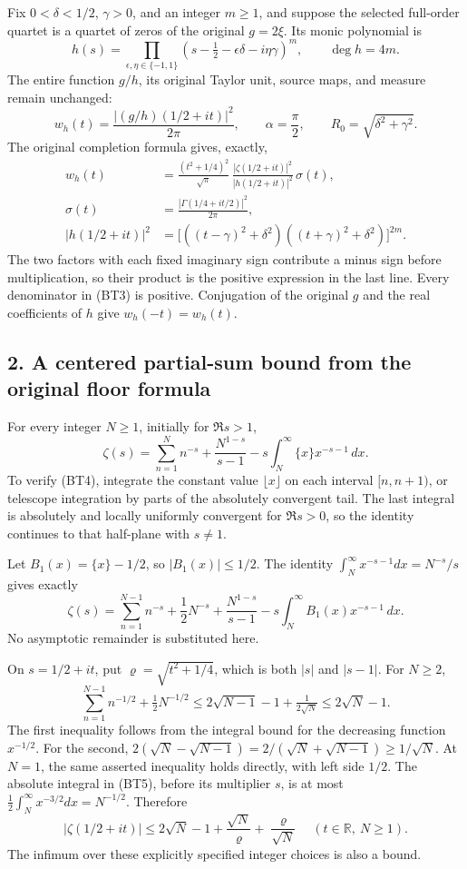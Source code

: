 Fix \(0<\delta<1/2\), \(\gamma>0\), and an integer \(m\ge1\), and suppose the selected full-order quartet is a quartet of zeros of the original \(g=2\xi\). Its monic polynomial is \[
h(s)=\prod_{\epsilon,\eta\in\{-1,1\}}
 (s-\tfrac12-\epsilon\delta-i\eta\gamma)^m,
\qquad \deg h=4m.
\tag{BT1}
\] The entire function \(g/h\), its original Taylor unit, source maps, and measure remain unchanged: \[
w_h(t)=\frac{|(g/h)(1/2+it)|^2}{2\pi},\qquad
\alpha=\frac\pi2,\qquad R_0=\sqrt{\delta^2+\gamma^2}.
\tag{BT2}
\] The original completion formula gives, exactly, \[
\begin{split}
w_h(t)
&=\frac{(t^2+1/4)^2}{\sqrt\pi}\,
 \frac{|\zeta(1/2+it)|^2}{|h(1/2+it)|^2}\,\sigma(t),\\
\sigma(t)
&=\frac{|\Gamma(1/4+it/2)|^2}{2\pi},\\
|h(1/2+it)|^2
&=\bigl[((t-\gamma)^2+\delta^2)
              ((t+\gamma)^2+\delta^2)\bigr]^{2m}.
\end{split}
\tag{BT3}
\] The two factors with each fixed imaginary sign contribute a minus sign before multiplication, so their product is the positive expression in the last line. Every denominator in (BT3) is positive. Conjugation of the original \(g\) and the real coefficients of \(h\) give \(w_h(-t)=w_h(t)\).

\subsection{2. A centered partial-sum bound from the original floor formula}\label{bt:a-centered-partial-sum-bound-from-the-original-floor-formula}

For every integer \(N\ge1\), initially for \(\Re s>1\), \[
\zeta(s)=\sum_{n=1}^{N}n^{-s}
 +\frac{N^{1-s}}{s-1}
 -s\int_N^\infty \{x\}x^{-s-1}\,dx.
\tag{BT4}
\] To verify (BT4), integrate the constant value \(\lfloor x\rfloor\) on each interval \([n,n+1)\), or telescope integration by parts of the absolutely convergent tail. The last integral is absolutely and locally uniformly convergent for \(\Re s>0\), so the identity continues to that half-plane with \(s\ne1\).

Let \(B_1(x)=\{x\}-1/2\), so \(|B_1(x)|\le1/2\). The identity \(\int_N^\infty x^{-s-1}dx=N^{-s}/s\) gives exactly \[
\zeta(s)=\sum_{n=1}^{N-1}n^{-s}+\frac12N^{-s}
 +\frac{N^{1-s}}{s-1}
 -s\int_N^\infty B_1(x)x^{-s-1}\,dx.
\tag{BT5}
\] No asymptotic remainder is substituted here.

On \(s=1/2+it\), put \(\varrho=\sqrt{t^2+1/4}\), which is both \(|s|\) and \(|s-1|\). For \(N\ge2\), \[
\sum_{n=1}^{N-1}n^{-1/2}+\tfrac12N^{-1/2}
\le 2\sqrt{N-1}-1+\tfrac1{2\sqrt N}
\le 2\sqrt N-1.
\] The first inequality follows from the integral bound for the decreasing function \(x^{-1/2}\). For the second, \(2(\sqrt N-\sqrt{N-1})=2/(\sqrt N+\sqrt{N-1})\ge1/\sqrt N\). At \(N=1\), the same asserted inequality holds directly, with left side \(1/2\). The absolute integral in (BT5), before its multiplier \(s\), is at most \(\tfrac12\int_N^\infty x^{-3/2}dx=N^{-1/2}\). Therefore \[
|\zeta(1/2+it)|
\le 2\sqrt N-1+\frac{\sqrt N}{\varrho}
                       +\frac{\varrho}{\sqrt N}
\quad(t\in\mathbb R,\ N\ge1).
\tag{BT6}
\] The infimum over these explicitly specified integer choices is also a bound.

